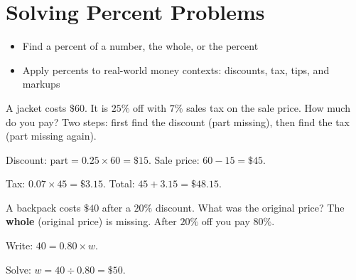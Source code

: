 \section{Solving Percent Problems}

\begin{stepGoal}
\begin{itemize}
    \item Find a percent of a number, the whole, or the percent
    \item Apply percents to real-world money contexts: discounts, tax, tips, and markups
\end{itemize}
\end{stepGoal}

\begin{stepVocabBox}
\end{stepVocabBox}

\begin{stepsCard}
\end{stepsCard}

\begin{stepExample}{A jacket costs $\$60$. It is $25\%$ off with $7\%$ sales tax on the sale price. How much do you pay?}
     Two steps: first find the discount (part missing), then find the tax (part missing again).

     Discount: $\text{part} = 0.25 \times 60 = \$15$. Sale price: $60 - 15 = \$45$.

     Tax: $0.07 \times 45 = \$3.15$. Total: $45 + 3.15 = \$48.15$.
\end{stepExample}

\begin{stepExample}{A backpack costs $\$40$ after a $20\%$ discount. What was the original price?}
     The \textbf{whole} (original price) is missing. After $20\%$ off you pay $80\%$.

     Write: $40 = 0.80 \times w$.

     Solve: $w = 40 \div 0.80 = \$50$.
\end{stepExample}

